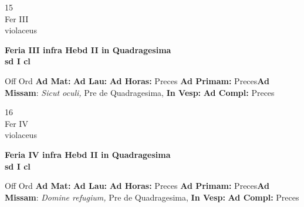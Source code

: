 \documentclass[10pt, openany]{book}
\begin{document}
    \begin{center}
        \begin{minipage}{3.5in}
            \vspace{2em}
            \begin{minipage}{0.5in}
                {\Huge 15} \\
                {\normalsize Fer III} \\
                {\normalsize violaceus}
            \end{minipage}
            \begin{minipage}{3.0in}
                \textbf{ \large Feria III infra Hebd II in Quadragesima \\
                \textnormal{\normalsize sd I cl}} \\ 
            \end{minipage}
            \begin{justify}Off Ord
                \textbf{Ad Mat: }
                \textbf{Ad Lau: }
                \textbf{Ad Horas: }Preces
                \textbf{Ad Primam: }Preces\textbf{Ad Missam}: \textit{Sicut oculi,} Pre de Quadragesima,  
                \textbf{In Vesp: }
                \textbf{Ad Compl: }Preces
            \end{justify}
        \end{minipage}
    \end{center}

    \begin{center}
        \begin{minipage}{3.5in}
            \vspace{2em}
            \begin{minipage}{0.5in}
                {\Huge 16} \\
                {\normalsize Fer IV} \\
                {\normalsize violaceus}
            \end{minipage}
            \begin{minipage}{3.0in}
                \textbf{ \large Feria IV infra Hebd II in Quadragesima \\
                \textnormal{\normalsize sd I cl}} \\ 
            \end{minipage}
            \begin{justify}Off Ord
                \textbf{Ad Mat: }
                \textbf{Ad Lau: }
                \textbf{Ad Horas: }Preces
                \textbf{Ad Primam: }Preces\textbf{Ad Missam}: \textit{Domine refugium,} Pre de Quadragesima,  
                \textbf{In Vesp: }
                \textbf{Ad Compl: }Preces
            \end{justify}
        \end{minipage}
    \end{center}
\end{document}
